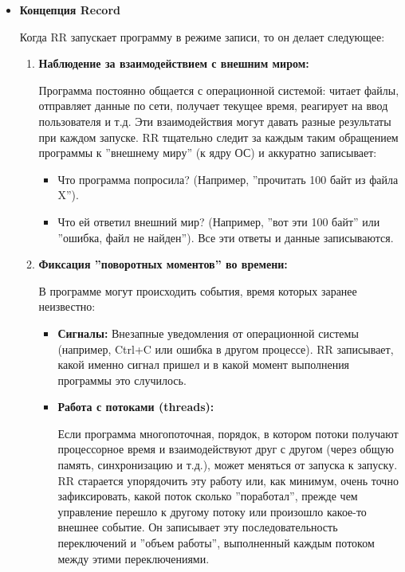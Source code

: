 \begin{itemize}

  \item \textbf{Концепция Record}
  
  Когда RR запускает программу в режиме записи, то он делает следующее:
    \begin{enumerate}
      \item \textbf{Наблюдение за взаимодействием с внешним миром:}

        Программа постоянно общается с операционной системой: читает файлы, отправляет
        данные по сети, получает текущее время, реагирует на ввод пользователя и т.д.
        Эти взаимодействия могут давать разные результаты при каждом запуске. RR
        тщательно следит за каждым таким обращением программы к ''внешнему миру'' (к ядру
        ОС) и аккуратно записывает: 
          \begin{itemize}
            \item Что программа попросила? (Например, ''прочитать 100 байт из файла X'').
            \item Что ей ответил внешний мир? (Например, ''вот эти 100 байт'' или ''ошибка, файл не найден'').
                  Все эти ответы и данные записываются.
          \end{itemize} 

      \item \textbf{Фиксация ''поворотных моментов'' во времени:}

      В программе могут происходить события, время которых заранее неизвестно:
        \begin{itemize}
          \item \textbf{Сигналы:} Внезапные уведомления от операционной системы (например, Ctrl+C или ошибка в другом процессе). 
                RR записывает, какой именно сигнал пришел и в какой момент выполнения программы это случилось.

          \item \textbf{Работа с потоками (threads):} 

          Если программа многопоточная, порядок, в котором потоки получают процессорное время и взаимодействуют друг с другом 
          (через общую память, синхронизацию и т.д.), может меняться от запуска к запуску. RR старается упорядочить эту работу или, как минимум, 
          очень точно зафиксировать, какой поток сколько ''поработал'', прежде чем управление перешло к другому потоку или произошло
          какое-то внешнее событие. Он записывает эту последовательность переключений и ''объем работы'', выполненный каждым потоком между 
          этими переключениями.


\end{itemize}
\end{enumerate}
\end{itemize}
